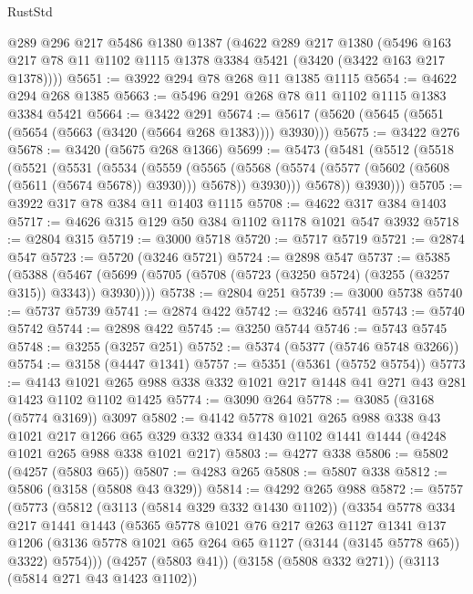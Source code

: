 \begin{lexlean}{RustStd}
\begin{coremodule}
    @289
    @296
    @217
    @5486
    @1380
    @1387
    (@4622
      @289
      @217
      @1380
      (@5496 @163 @217 @78 @11 @1102 @1115 @1378 @3384 @5421 (@3420 (@3422 @163 @217 @1378))))
@5651 := @3922 @294 @78 @268 @11 @1385 @1115
@5654 := @4622 @294 @268 @1385
@5663 := @5496 @291 @268 @78 @11 @1102 @1115 @1383 @3384 @5421
@5664 := @3422 @291
@5674 := @5617 (@5620 (@5645 (@5651 (@5654 (@5663 (@3420 (@5664 @268 @1383)))) @3930)))
@5675 := @3422 @276
@5678 := @3420 (@5675 @268 @1366)
@5699 := @5473
    (@5481
      (@5512
        (@5518
          (@5521
            (@5531
              (@5534
                (@5559
                  (@5565
                    (@5568 (@5574 (@5577 (@5602 (@5608 (@5611 (@5674 @5678)) @3930))) @5678))
                    @3930)))
              @5678))
          @3930)))
@5705 := @3922 @317 @78 @384 @11 @1403 @1115
@5708 := @4622 @317 @384 @1403
@5717 := @4626 @315 @129 @50 @384 @1102 @1178 @1021 @547 @3932
@5718 := @2804 @315
@5719 := @3000 @5718
@5720 := @5717 @5719
@5721 := @2874 @547
@5723 := @5720 (@3246 @5721)
@5724 := @2898 @547
@5737 := @5385
    (@5388 (@5467 (@5699 (@5705 (@5708 (@5723 (@3250 @5724) (@3255 (@3257 @315)) @3343)) @3930))))
@5738 := @2804 @251
@5739 := @3000 @5738
@5740 := @5737 @5739
@5741 := @2874 @422
@5742 := @3246 @5741
@5743 := @5740 @5742
@5744 := @2898 @422
@5745 := @3250 @5744
@5746 := @5743 @5745
@5748 := @3255 (@3257 @251)
@5752 := @5374 (@5377 (@5746 @5748 @3266))
@5754 := @3158 (@4447 @1341)
@5757 := @5351 (@5361 (@5752 @5754))
@5773 := @4143 @1021 @265 @988 @338 @332 @1021 @217 @1448 @41 @271 @43 @281 @1423 @1102 @1102 @1425
@5774 := @3090 @264
@5778 := @3085 (@3168 (@5774 @3169)) @3097
@5802 := @4142
    @5778
    @1021
    @265
    @988
    @338
    @43
    @1021
    @217
    @1266
    @65
    @329
    @332
    @334
    @1430
    @1102
    @1441
    @1444
    (@4248 @1021 @265 @988 @338 @1021 @217)
@5803 := @4277 @338
@5806 := @5802 (@4257 (@5803 @65))
@5807 := @4283 @265
@5808 := @5807 @338
@5812 := @5806 (@3158 (@5808 @43 @329))
@5814 := @4292 @265 @988
@5872 := @5757
    (@5773
      (@5812
        (@3113 (@5814 @329 @332 @1430 @1102))
        (@3354
          @5778
          @334
          @217
          @1441
          @1443
          (@5365
            @5778
            @1021
            @76
            @217
            @263
            @1127
            @1341
            @137
            @1206
            (@3136 @5778 @1021 @65 @264 @65 @1127 (@3144 (@3145 @5778 @65)) @3322)
            @5754)))
      (@4257 (@5803 @41))
      (@3158 (@5808 @332 @271))
      (@3113 (@5814 @271 @43 @1423 @1102))

\end{coremodule}
\end{lexlean}
